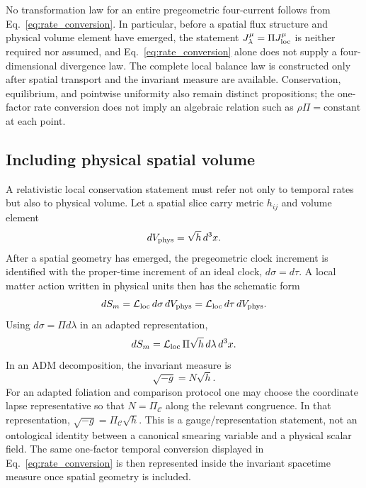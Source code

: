 \documentclass[11pt]{article}
\begin{document}
No transformation law for an entire pregeometric four-current follows from Eq.~\eqref{eq:rate_conversion}. In particular, before a spatial flux structure and physical volume element have emerged, the statement
$J^\mu_{\lambda}=\Pi J^\mu_{\rm loc}$ is neither required nor assumed, and Eq.~\eqref{eq:rate_conversion} alone does not supply a four-dimensional divergence law. The complete local balance law is constructed only after spatial transport and the invariant measure are available. Conservation, equilibrium, and pointwise uniformity also remain distinct propositions; the one-factor rate conversion does not imply an algebraic relation such as $\rho\Pi=\text{constant}$ at each point.

\subsection{Including physical spatial volume}

A relativistic local conservation statement must refer not only to temporal rates but also to physical volume. Let a spatial slice carry metric $h_{ij}$ and volume element
\begin{equation}
    dV_{\rm phys}=\sqrt h\,d^3x.
\end{equation}
After a spatial geometry has emerged, the pregeometric clock increment is identified with the proper-time increment of an ideal clock, $d\sigma=d\tau$. A local matter action written in physical units then has the schematic form
\begin{equation}
    dS_m=\mathcal L_{\rm loc}\,d\sigma\,dV_{\rm phys}
        =\mathcal L_{\rm loc}\,d\tau\,dV_{\rm phys}.
\end{equation}
Using $d\sigma=\Pi d\lambda$ in an adapted representation,
\begin{equation}
    dS_m
    =\mathcal L_{\rm loc}\,\Pi\sqrt h\,d\lambda\,d^3x.
    \label{eq:measure_step}
\end{equation}
In an ADM decomposition, the invariant measure is
\begin{equation}
    \boxed{\sqrt{-g}=N\sqrt h.}
    \label{eq:measure_identity}
\end{equation}
For an adapted foliation and comparison protocol one may choose the coordinate lapse representative so that $N=\Pi_{\mathcal C}$ along the relevant congruence. In that representation, $\sqrt{-g}=\Pi_{\mathcal C}\sqrt h$. This is a gauge/representation statement, not an ontological identity between a canonical smearing variable and a physical scalar field. The same one-factor temporal conversion displayed in Eq.~\eqref{eq:rate_conversion} is then represented inside the invariant spacetime measure once spatial geometry is included.
\end{document}

